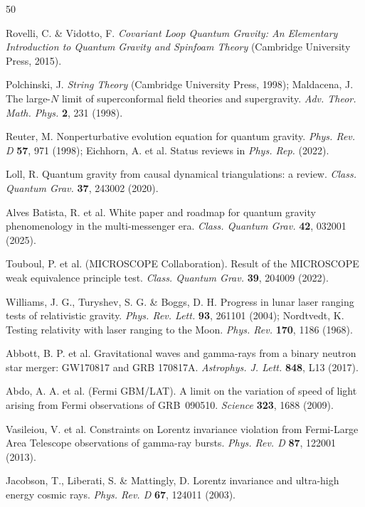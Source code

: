 \documentclass[UTF8,fontset=none,11pt,a4paper]{ctexart}
\begin{document}
\begin{thebibliography}{50}\small

 Rovelli, C. \& Vidotto, F. \emph{Covariant Loop Quantum Gravity: An
Elementary Introduction to Quantum Gravity and Spinfoam Theory} (Cambridge University Press,
2015).

 Polchinski, J. \emph{String Theory} (Cambridge University Press, 1998);
Maldacena, J. The large-$N$ limit of superconformal field theories and supergravity.
\emph{Adv. Theor. Math. Phys.} \textbf{2}, 231 (1998).

 Reuter, M. Nonperturbative evolution equation for quantum gravity.
\emph{Phys. Rev. D} \textbf{57}, 971 (1998); Eichhorn, A. et al. Status reviews in
\emph{Phys. Rep.} (2022).

 Loll, R. Quantum gravity from causal dynamical triangulations: a review.
\emph{Class. Quantum Grav.} \textbf{37}, 243002 (2020).

 Alves Batista, R. et al. White paper and roadmap for quantum gravity
phenomenology in the multi-messenger era. \emph{Class. Quantum Grav.} \textbf{42}, 032001 (2025).

 Touboul, P. et al. (MICROSCOPE Collaboration). Result of the MICROSCOPE
weak equivalence principle test. \emph{Class. Quantum Grav.} \textbf{39}, 204009 (2022).

 Williams, J. G., Turyshev, S. G. \& Boggs, D. H. Progress in lunar laser
ranging tests of relativistic gravity. \emph{Phys. Rev. Lett.} \textbf{93}, 261101 (2004);
Nordtvedt, K. Testing relativity with laser ranging to the Moon. \emph{Phys. Rev.}
\textbf{170}, 1186 (1968).

 Abbott, B. P. et al. Gravitational waves and gamma-rays from a binary neutron
star merger: GW170817 and GRB 170817A. \emph{Astrophys. J. Lett.} \textbf{848}, L13 (2017).

 Abdo, A. A. et al. (Fermi GBM/LAT). A limit on the variation of speed of
light arising from Fermi observations of GRB~090510. \emph{Science} \textbf{323}, 1688 (2009).

 Vasileiou, V. et al. Constraints on Lorentz invariance violation from
Fermi-Large Area Telescope observations of gamma-ray bursts. \emph{Phys. Rev. D} \textbf{87},
122001 (2013).

 Jacobson, T., Liberati, S. \& Mattingly, D. Lorentz invariance and
ultra-high energy cosmic rays. \emph{Phys. Rev. D} \textbf{67}, 124011 (2003).


\end{thebibliography}
\end{document}
